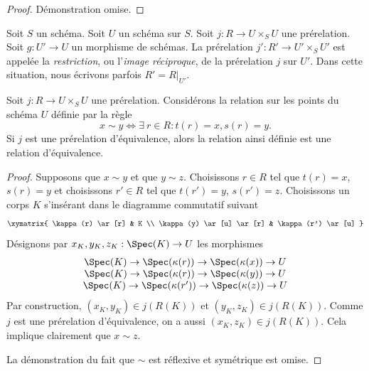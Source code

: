 \begin{proof}
Démonstration omise.
\end{proof}

\begin{definition}
\label{definition-restrict-relation}
Soit $S$ un schéma.
Soit $U$ un schéma sur $S$.
Soit $j : R \to U \times_S U$ une prérelation.
Soit $g : U' \to U$ un morphisme de schémas.
La prérelation $j' : R' \to U' \times_S U'$ est appelée
la {\it restriction}, ou l'{\it image réciproque}, de la prérelation $j$ sur $U'$.
Dans cette situation, nous écrivons parfois $R' = R|_{U'}$.
\end{definition}

\begin{lemma}
\label{lemma-pre-equivalence-equivalence-relation-points}
Soit $j : R \to U \times_S U$ une prérelation.
Considérons la relation sur les points du schéma $U$ définie par
la règle
$$
x \sim y
\Leftrightarrow
\exists\ r \in R :
t(r) = x,
s(r) = y.
$$
Si $j$ est une prérelation d'équivalence, alors la relation ainsi définie est une
relation d'équivalence.
\end{lemma}

\begin{proof}
Supposons que $x \sim y$ et que $y \sim z$.
Choisissons $r \in R$ tel que $t(r) = x$, $s(r) = y$ et
choisissons $r' \in R$ tel que $t(r') = y$, $s(r') = z$.
Choisissons un corps $K$ s'insérant dans le diagramme commutatif
suivant
$$
\xymatrix{
\kappa(r) \ar[r] & K \\
\kappa(y) \ar[u] \ar[r] & \kappa(r') \ar[u]
}
$$
Désignons par $x_K, y_K, z_K : \Spec(K) \to U$
les morphismes
$$
\begin{matrix}
\Spec(K) \to \Spec(\kappa(r))
\to
\Spec(\kappa(x)) \to U \\
\Spec(K) \to \Spec(\kappa(r))
\to
\Spec(\kappa(y)) \to U \\
\Spec(K) \to \Spec(\kappa(r'))
\to
\Spec(\kappa(z)) \to U
\end{matrix}
$$
Par construction, $(x_K, y_K) \in j(R(K))$ et
$(y_K, z_K) \in j(R(K))$. Comme $j$ est une prérelation d'équivalence,
on a aussi $(x_K, z_K) \in j(R(K))$.
Cela implique clairement que $x \sim z$.

\medskip\noindent
La démonstration du fait que $\sim$ est réflexive et symétrique est omise.
\end{proof}

